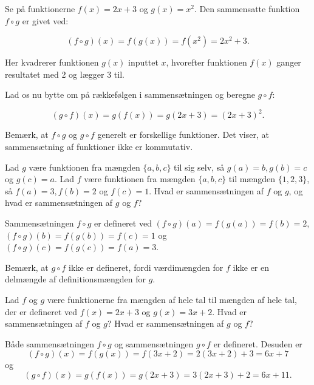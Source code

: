 \begin{example}
    

Se på funktionerne \( f(x) = 2x + 3 \) og \( g(x) = x^2 \). Den sammensatte funktion \( f \circ g \) er givet ved:

\[
(f \circ g)(x) = f(g(x)) = f(x^2) = 2x^2 + 3.
\]

Her kvadrerer funktionen \( g(x) \) inputtet \( x \), hvorefter funktionen \( f(x) \) ganger resultatet med 2 og lægger 3 til.
\end{example}

Lad os nu bytte om på rækkefølgen i sammensætningen og beregne \( g \circ f \):

\[
(g \circ f)(x) = g(f(x)) = g(2x + 3) = (2x + 3)^2.
\]

Bemærk, at \( f \circ g \) og \( g \circ f \) generelt er forskellige funktioner. Det viser, at sammensætning af funktioner ikke er kommutativ.

\begin{example}
    Lad $g$ være funktionen fra mængden $\{a, b, c\}$ til sig selv, så $g(a)=b, g(b)=c$ og $g(c)=a$. Lad $f$ være funktionen fra mængden $\{a, b, c\}$ til mængden $\{1,2,3\}$, så $f(a)=3, f(b)=2$ og $f(c)=1$. Hvad er sammensætningen af $f$ og $g$, og hvad er sammensætningen af $g$ og $f$?

    \begin{solution}
        Sammensætningen $f \circ g$ er defineret ved $(f \circ g)(a)=f(g(a))=f(b)=2$, $(f \circ g)(b)=f(g(b))=f(c)=1$ og $(f \circ g)(c)=f(g(c))=f(a)=3$.
        
        Bemærk, at $g \circ f$ ikke er defineret, fordi værdimængden for $f$ ikke er en delmængde af definitionsmængden for $g$.
    \end{solution}
\end{example}


\begin{example}
Lad $f$ og $g$ være funktionerne fra mængden af hele tal til mængden af hele tal, der er defineret ved $f(x)=2 x+3$ og $g(x)=3 x+2$. Hvad er sammensætningen af $f$ og $g$? Hvad er sammensætningen af $g$ og $f$?

\begin{solution}
Både sammensætningen $f \circ g$ og sammensætningen $g \circ f$ er defineret. Desuden er
\[
(f \circ g)(x)=f(g(x))=f(3 x+2)=2(3 x+2)+3=6 x+7
\]
og
\[
(g \circ f)(x)=g(f(x))=g(2 x+3)=3(2 x+3)+2=6 x+11 .
\]
\end{solution}
\end{example}

